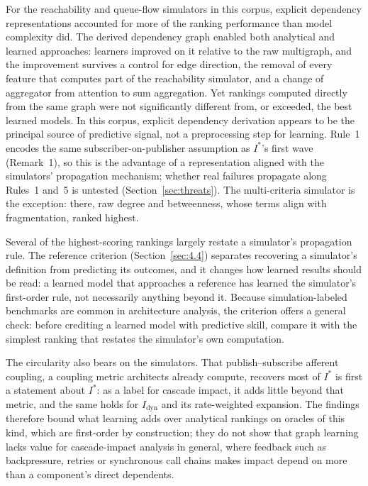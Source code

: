 \documentclass[preprint,3p]{elsarticle}
\begin{document}
For the reachability and queue-flow simulators in this corpus, explicit dependency representations accounted for more of the ranking performance than model complexity did. The derived dependency graph enabled both analytical and learned approaches: learners improved on it relative to the raw multigraph, and the improvement survives a control for edge direction, the removal of every feature that computes part of the reachability simulator, and a change of aggregator from attention to sum aggregation. Yet rankings computed directly from the same graph were not significantly different from, or exceeded, the best learned models. In this corpus, explicit dependency derivation appears to be the principal source of predictive signal, not a preprocessing step for learning. Rule~1 encodes the same subscriber-on-publisher assumption as $I^*$'s first wave (Remark~1), so this is the advantage of a representation aligned with the simulators' propagation mechanism; whether real failures propagate along Rules~1 and~5 is untested (Section~\ref{sec:threats}). The multi-criteria simulator is the exception: there, raw degree and betweenness, whose terms align with fragmentation, ranked highest.

Several of the highest-scoring rankings largely restate a simulator's propagation rule. The reference criterion (Section~\ref{sec:4.4}) separates recovering a simulator's definition from predicting its outcomes, and it changes how learned results should be read: a learned model that approaches a reference has learned the simulator's first-order rule, not necessarily anything beyond it. Because simulation-labeled benchmarks are common in architecture analysis, the criterion offers a general check: before crediting a learned model with predictive skill, compare it with the simplest ranking that restates the simulator's own computation.

The circularity also bears on the simulators. That publish--subscribe afferent coupling, a coupling metric architects already compute, recovers most of $I^*$ is first a statement about $I^*$: as a label for cascade impact, it adds little beyond that metric, and the same holds for $I_{\text{dyn}}$ and its rate-weighted expansion. The findings therefore bound what learning adds over analytical rankings on oracles of this kind, which are first-order by construction; they do not show that graph learning lacks value for cascade-impact analysis in general, where feedback such as backpressure, retries or synchronous call chains makes impact depend on more than a component's direct dependents.
\end{document}
